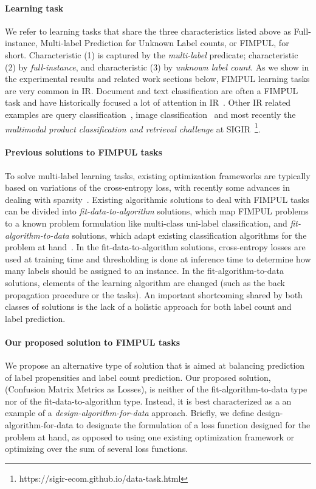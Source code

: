 \paragraph{Learning task}
We refer to learning tasks that share the three characteristics listed above as Full-instance, Multi-label Prediction for Unknown Label counts, or FIMPUL, for short. 
Characteristic (1) is captured by the \emph{multi-label} predicate; characteristic (2) by \emph{full-instance}, and characteristic (3) by \emph{unknown label count}.
As we show in the experimental results and related work sections below, FIMPUL learning tasks are very common in IR. Document and text classification are often a FIMPUL task and have historically focused a lot of attention in IR~\cite{IRClassStat, textCategorization, statTextCategorization, documentClassification}. Other IR related examples are query classification~\cite{queryClassification}, image classification~\cite{imageClassification} and most recently the \textit{multimodal product classification and retrieval challenge} at SIGIR~\footnote{https://sigir-ecom.github.io/data-task.html}.

\paragraph{Previous solutions to FIMPUL tasks}
To solve multi-label learning tasks, existing optimization frameworks are typically based on variations of the cross-entropy loss, with recently some advances in dealing with sparsity~\citep[see, e.g.,][]{focalLoss,tencent}. 
Existing algorithmic solutions to deal with FIMPUL tasks can be divided into \emph{fit-data-to-algorithm} solutions, which map FIMPUL problems to a known problem formulation like multi-class uni-label classification, and \emph{fit-algorithm-to-data} solutions, which adapt existing classification algorithms for the problem at hand~\citep{multilabelMethods}. In the fit-data-to-algorithm solutions, cross-entropy losses are used at training time and thresholding is done at inference time to determine how many labels should be assigned to an instance. In the fit-algorithm-to-data solutions, elements of the learning algorithm are changed (such as the back propagation procedure or the tasks). An important shortcoming shared by both classes of solutions is the lack of a holistic approach for both label count and label prediction.

\paragraph{Our proposed solution to FIMPUL tasks}
We propose an alternative type of solution that is aimed at balancing prediction of label propensities  and label count prediction. Our proposed solution, \solution (Confusion Matrix Metrics as Losses), is neither of the fit-algorithm-to-data type nor of the fit-data-to-algorithm type. 
Instead, it is best characterized as a an example of a \emph{design-algorithm-for-data} approach.
Briefly, we define design-algorithm-for-data to designate the formulation of a loss function designed for the problem at hand, as opposed to using one existing optimization framework or optimizing over the sum of several loss functions.

